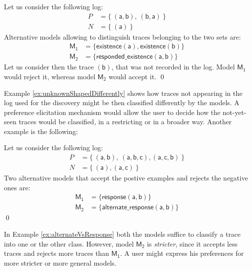 \begin{example}
\label{ex:unknownShapedDifferently}
Let us consider the following log:
\begin{align*}
P & = \{\ (\mathsf{a}, \mathsf{b}),\ (\mathsf{b}, \mathsf{a})\ \} \\
N & = \{\ (\mathsf{a})\ \}
\end{align*}
%
Alternative models allowing to distinguish traces belonging to the two sets are:
\begin{align*}
\mathsf{M_1} & = \{ \mathsf{existence(a),existence(b)}\} \\
\mathsf{M_2} & = \{ \mathsf{responded\_existence(a, b)}\}
\end{align*}
%
Let us consider then the trace $\mathsf{(b)}$, that was not recorded in the log. Model $\mathsf{M_1}$ would reject it, whereas model $\mathsf{M_2}$ would accept it.
\qed
\end{example}

Example \ref{ex:unknownShapedDifferently} shows how traces not appearing in the log used for the discovery might be then classified differently by the models. A preference elicitation mechanism would allow the user to decide how the not-yet-seen traces would be classified, in a restricting or in a broader way. Another example is the following:

\begin{example}
\label{ex:alternateVsResponse}
Let us consider the following log:
\begin{align*}
P & = \{\ (\mathsf{a}, \mathsf{b}),\ (\mathsf{a}, \mathsf{b}, \mathsf{c}),(\mathsf{a}, \mathsf{c}, \mathsf{b})\ \} \\
N & = \{\ (\mathsf{a}), (\mathsf{a}, \mathsf{c})\ \}
\end{align*}
%
Two alternative models that accept the postive examples and rejects the negative ones are:
\begin{align*}
\mathsf{M_1} & = \{ \mathsf{response(a,b)}\} \\
\mathsf{M_2} & = \{ \mathsf{alternate\_response(a, b)}\}
\end{align*}
\qed
\end{example}

In Example \ref{ex:alternateVsResponse} both the models suffice to classify a trace into one or the other class. However, model $\mathsf{M_2}$ is \emph{stricter}, since it accepts less traces and rejects more traces than $\mathsf{M_1}$. A user might express his preferences for more stricter or more general models.


